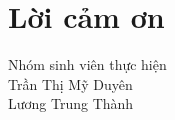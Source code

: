 \chapter*{Lời cảm ơn}
\label{thanks}


\begin{flushright}
    Nhóm sinh viên thực hiện \\
    Trần Thị Mỹ Duyên \\
    Lương Trung Thành
\end{flushright}